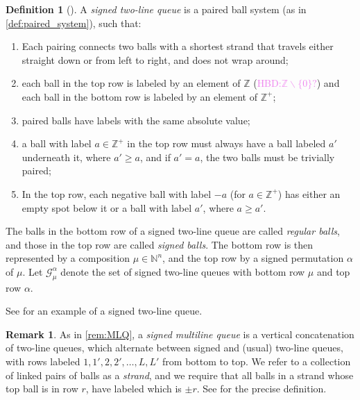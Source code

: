\documentclass[12pt]{amsart}
\theoremstyle{definition}
\newtheorem{definition}[thm]{Definition}
\newtheorem{remark}[thm]{Remark}
\newcommand{\ZZ}{\mathbb Z}
\newcommand{\mcG}{\mathcal{G}}
\newcommand{\NN}{\mathbb N}
\def\HBD#1{(\textcolor{violet}{HBD:#1})}
\begin{document}
\begin{definition}[\cite{BenDaliWilliams2025}]\label{def:signed_two-row}
A \emph{signed two-line queue} is a paired ball system (as in \cref{def:paired_system}), 
 such that:
\begin{enumerate}
 \item\label{GSMLQ:item1} Each pairing connects two balls with a shortest strand that travels either straight down or from left to right, and does not wrap around;
\item each ball in the top row is labeled by an element of $\ZZ$ \HBD{$\ZZ\backslash\{0\}?$} and each ball in the bottom row is labeled by an element of $\ZZ^+$;
\item paired balls have labels with the same absolute value;
 \item\label{GSMLQ:item2} a ball with label $a\in \ZZ^+$ in the top row
            must always have a ball labeled $a'$ underneath it, where $a' \geq a$, and if $a'=a$, the two balls must be trivially paired;
    \item\label{GSMLQ:item3} In the top row, each negative ball with label $-a$ (for $a\in \ZZ^+$) has either an empty spot below it or a ball with label $a'$, where $a \geq a'$.
\end{enumerate}
\end{definition} 
The balls in the bottom row of a signed two-line queue are called \emph{regular balls}, and those in the top row are called \emph{signed balls}.
The bottom row is then represented by a composition $\mu\in \NN^n$, and the top row by a signed permutation $\alpha$ of $\mu$. Let $\mcG^\alpha_\mu$ denote the
set of signed two-line queues with bottom row $\mu$ and top row $\alpha$. 

See  for an example of a signed two-line queue.


\begin{remark}\label{rem:sMLQ}
As in \cref{rem:MLQ}, a \emph{signed multiline queue}
    is a vertical concatenation of 
    two-line queues, which alternate between signed and (usual) two-line queues, with rows labeled $1, 1', 2, 2', \dots, L, L'$ from bottom to top.
    We refer to a collection of linked pairs of balls as a \emph{strand},
    and we require that all balls in a strand whose top ball is in row $r$, have labeled which is $\pm r$.
    See \cite{BenDaliWilliams2025} for the precise definition.
\end{remark}
\end{document}
